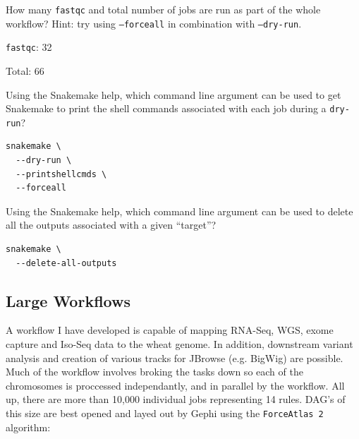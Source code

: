 \begin{questions}

How many \texttt{fastqc} and total number of jobs are run as part of the whole workflow?
Hint: try using \texttt{--forceall} in combination with \texttt{--dry-run}.

\begin{answer}

\texttt{fastqc}: 32

Total: 66

\end{answer}

Using the Snakemake help, which command line argument can be used to get Snakemake to print the shell commands associated with each job during a \texttt{dry-run}?

\begin{answer}

\begin{lstlisting}
snakemake \
  --dry-run \
  --printshellcmds \
  --forceall
\end{lstlisting}

\end{answer}

Using the Snakemake help, which command line argument can be used to delete all the outputs associated with a given ``target''?

\begin{answer}

\begin{lstlisting}
snakemake \
  --delete-all-outputs
\end{lstlisting}

\end{answer}

\end{questions}

\subsection{Large Workflows}

A workflow I have developed is capable of mapping RNA-Seq, WGS, exome capture and Iso-Seq data to the wheat genome.
In addition, downstream variant analysis and creation of various tracks for JBrowse (e.g. BigWig) are possible.
Much of the workflow involves broking the tasks down so each of the chromosomes is proccessed independantly, and in parallel by the workflow.
All up, there are more than 10,000 individual jobs representing 14 rules.
DAG's of this size are best opened and layed out by Gephi using the \texttt{ForceAtlas 2} algorithm:

